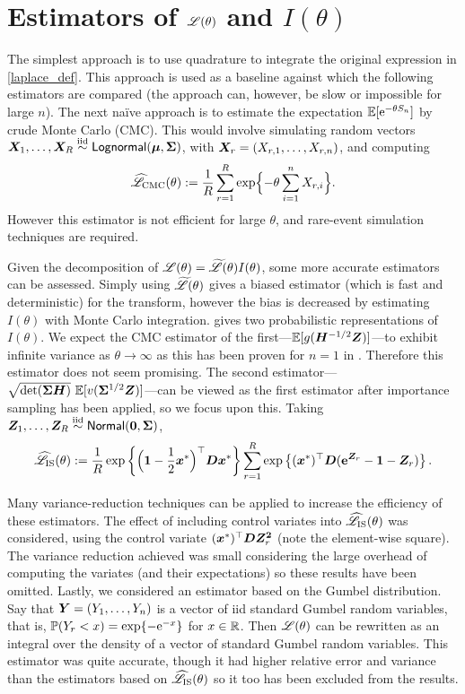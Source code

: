 \section{Estimators of $\mathscr{L}(\theta)$ and $I(\theta)$}\label{S:Laplace}

The simplest approach is to use quadrature to integrate the original expression in
\eqref{laplace_def}. This approach is used as a baseline against which the
following estimators are compared (the approach can, however,  be slow or
impossible for large $n$). The next na{\"i}ve approach is to estimate the
expectation $\operatorname{{\mathbb E}}[\mathrm{e}^{-\theta S_n}]$ by crude Monte Carlo (CMC). This would
involve simulating random vectors $\bm{X}_1, \dots, \bm{X}_R \overset{\smash{\mathrm{iid}}}{\sim} \mathsf{Lognormal}(\bm{\mu},
\bm{\Sigma})$, with $\bm{X}_r = (X_{r,1}, \dots, X_{r,n})$, and computing
\[ \widehat{\mathscr{L}}_{\mathrm{CMC}}(\theta) := \frac{1}{R} \sum_{r=1}^R
  \exp\Bigl\{-\theta \sum_{i=1}^n X_{r,i}\Bigr\}. \]
However this estimator is not efficient for large $\theta$, and rare-event
simulation techniques are required.

Given the decomposition of $\mathscr{L}(\theta) = \widetilde{\mathscr{L}}(\theta)
I(\theta)$, some more accurate estimators can be assessed. Simply using
$\widetilde{\mathscr{L}}(\theta)$ gives a biased estimator (which is fast and
deterministic) for the transform, however the bias is decreased by estimating
$I(\theta)$ with Monte Carlo integration.  gives
two probabilistic representations of $I(\theta)$. We expect the CMC estimator
of the first---$\operatorname{{\mathbb E}}[g(\bm{H}^{-1/2}\bm{Z})
]$---to exhibit infinite variance as $\theta \to \infty$ as this has been
proven for $n=1$ in \cite{asmussen2014laplace}. Therefore this estimator does
not seem promising. The second estimator---$\sqrt{\det(\bm{\Sigma}
  \bm{H})} \, \operatorname{{\mathbb E}}[ v(\bm{\Sigma}^{1/2} \bm{Z}) ]$---can be viewed as the first
estimator after importance sampling has been applied, so we focus upon
this. Taking $\bm{Z}_1, \dots, \bm{Z}_R \overset{\smash{\mathrm{iid}}}{\sim} \mathsf{Normal}(\bm{0}, \bm{\Sigma})$,
\[ \widehat{\mathscr{L}}_{\mathrm{IS}}(\theta) := \frac{1}{R}
  \exp\left\{ \Bigl(\bm{1} - \frac12 \bm{x}^* \Bigr)^\top \bm{D} \bm{x}^* \right\}
  \sum_{r=1}^R \exp\left\{ (\bm{x}^*)^\top \bm{D} (\text{\bf{e}}^{\bm{Z}_r} - \bm{1} - \bm{Z}_r)
  \right\}. \]

Many variance-reduction techniques can be applied to increase the efficiency
of these estimators. The effect of including control variates into
$\widehat{\mathscr{L}}_{\mathrm{IS}}(\theta)$ was considered, using the control
variate $(\bm{x}^*)^\top \bm{D} \bm{Z}_r^{\bm{2}}$ (note the element-wise square). The
variance reduction achieved was small considering the large overhead of
computing the variates (and their expectations) so these results have been
omitted. Lastly, we considered an estimator based on the Gumbel
distribution. Say that $\bm{Y} = (Y_1, \dots, Y_n)$ is a vector of iid standard
Gumbel random variables, that is, $\operatorname{{\mathbb P}}(Y_r < x) = \exp\{ -\mathrm{e}^{-x} \}$ for
$x \in \mathbb{R}$. Then $\mathscr{L}(\theta)$ can be rewritten as an integral over the
density of a vector of standard Gumbel random variables. This estimator was
quite accurate, though it had higher relative error and variance than the
estimators based on $\widehat{\mathscr{L}}_{\mathrm{IS}}(\theta)$ so it too has
been excluded from the results.

